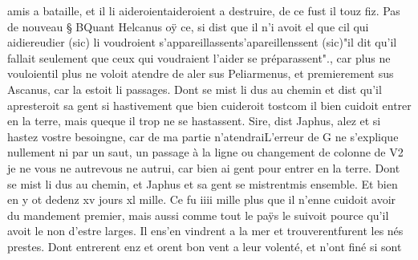 \documentclass{article}
\begin{document}
\begin{pages}
                  amis a bataille, et il li 
                  aideroientaideroient a destruire, de ce fust 
                  il touz fiz. \pend
            \pstart Pas de nouveau § BQuant
                  Helcanus oÿ ce, si dist que il n’i avoit el que cil qui 
                     aidiereudier (sic) li voudroient 
                     s’appareillassents'apareillenssent (sic)"il dit qu'il fallait seulement que ceux
                  qui voudraient l'aider se préparassent"., car 
                  plus ne vouloientil plus ne voloit atendre de aler sus Peliarmenus, et
               premierement sus Ascanus, car la estoit li
               passages. Dont se mist li dus au chemin et dist qu’il apresteroit sa gent si hastivement 
                     que bien cuideroit tostcom il bien cuidoit entrer en la terre, mais 
                     queque il trop ne se hastassent. Sire, dist
                     Japhus, alez et si hastez vostre besoingne,
                  car de ma partie 
                     n’atendraiL'erreur de G ne s'explique nullement ni par un
                     saut, un passage à la ligne ou changement de colonne de V2 je 
                     ne vous ne autrevous ne autrui, car bien ai gent pour entrer en la terre. Dont se mist li dus au chemin, et Japhus et sa gent 
                  se mistrentmis ensemble. Et bien en y ot dedenz xv jours xl mille. Ce
               fu iiii mille plus que il 
                  n’enne cuidoit avoir du mandement premier, mais aussi comme tout le paÿs le suivoit
               pource qu’il avoit le non d’estre larges. Il 
                  ens'en vindrent a la mer et 
                  trouverentfurent les nés
               prestes.
               Dont entrerent enz et orent 
                  bon vent a leur volenté, et n’ont finé si sont 


\end{pages}
\end{document}
